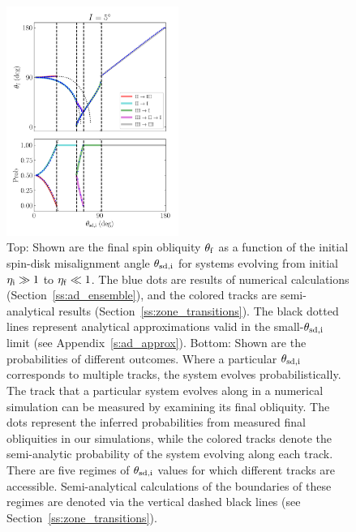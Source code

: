 \documentclass[
        fleqn,
        usenatbib,
    ]{mnras}
\begin{document}
\begin{figure}
    \centering
    \includegraphics[width=0.5\textwidth]{plots_diskdisp/3_ensemble_05_35.png}
    \caption{Top: Shown are the final spin obliquity $\theta_{\rm f}$ as a
    function of the initial spin-disk misalignment angle $\theta_{\rm sd, i}$
    for systems evolving from initial $\eta_{\rm i} \gg 1$ to $\eta_{\rm f} \ll
    1$. The blue dots are results of numerical calculations
    (Section~\ref{ss:ad_ensemble}), and the colored tracks are semi-analytical
    results (Section~\ref{ss:zone_transitions}). The black dotted lines
    represent analytical approximations valid in the small-$\theta_{\rm sd, i}$
    limit (see Appendix~\ref{s:ad_approx}). Bottom: Shown are the probabilities
    of different outcomes. Where a particular $\theta_{\rm sd, i}$ corresponds
    to multiple tracks, the system evolves probabilistically. The track that a
    particular system evolves along in a numerical simulation can be measured by
    examining its final obliquity. The dots represent the inferred probabilities
    from measured final obliquities in our simulations, while the colored tracks
    denote the semi-analytic probability of the system evolving along each
    track. There are five regimes of $\theta_{\rm sd, i}$ values for which
    different tracks are accessible. Semi-analytical calculations of the
    boundaries of these regimes are denoted via the vertical dashed black lines
    (see Section~\ref{ss:zone_transitions}).}\label{fig:ad_ensemble}
\end{figure}
\end{document}

